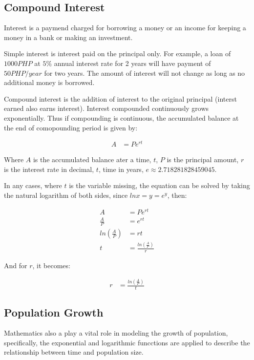 \documentclass[12pt, UTF8]{article}
\begin{document}
	\subsection*{Compound Interest}
	
	Interest is a paymend charged for borrowing a money or an income for keeping a money in a bank or making an investment.
	
	Simple interest is interest paid on the principal only. For example, a loan of $1000 PHP$ at $5\%$ annual interest rate for 2 years will have payment of $50 PHP/year$ for two years. The amount of interest will not change as long as no additional money is borrowed.
	
	Compound interest is the addition of interest to the original principal (interst earned also earns interest). Interest compounded continuously grows exponentially. Thus if compounding is continuous, the accumulated balance at the end of comopounding period is given by:
	
	\begin{align}
		A &= Pe^{rt} 
	\end{align}
	
	Where $A$ is the accumulated balance ater a time, $t$, $P$ is the principal amount, $r$ is the interest rate in decimal, $t$, time in years, $e \approx 2.718281828459045$.
	
	In any cases, where $t$ is the variable missing, the equation can be solved by taking the natural logarithm of both sides, since $ln x = y = e^y$, then:
	
	\begin{align}
		A &= Pe^{rt} \\
		\frac{A}{P} &= e^{rt}  \nonumber \\
		ln(\frac{A}{P}) &= rt  \nonumber \\
		t &= \frac{ln(\frac{A}{P})}{r} 
	\end{align}
	
	And for $r$, it becomes:
	
	\begin{align}
		r &= \frac{ln(\frac{A}{P})}{t} 
	\end{align}
	
	\subsection*{Population  Growth}
	
	Mathematics also a play a vital role in modeling the growth of population, specifically, the exponential and logarithmic funcctions are applied to describe the relationship between time and population size.
	
\end{document}
